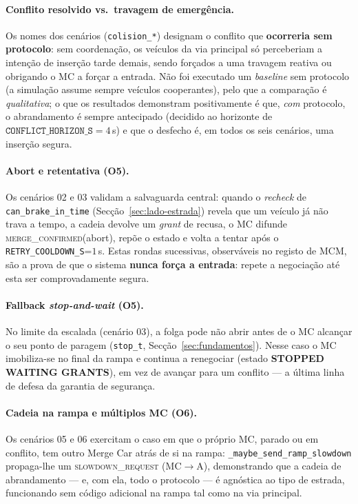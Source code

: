 \documentclass[11pt,a4paper]{article}
\begin{document}
\paragraph{Conflito resolvido vs.\ travagem de emergência.} Os nomes dos cenários
(\texttt{colision\_*}) designam o conflito que \textbf{ocorreria sem protocolo}: sem
coordenação, os veículos da via principal só perceberiam a intenção de inserção tarde
demais, sendo forçados a uma travagem reativa ou obrigando o MC a forçar a entrada. Não
foi executado um \emph{baseline} sem protocolo (a simulação assume sempre veículos
cooperantes), pelo que a comparação é \emph{qualitativa}; o que os resultados demonstram
positivamente é que, \emph{com} protocolo, o abrandamento é sempre antecipado (decidido
ao horizonte de $\texttt{CONFLICT\_HORIZON\_S}=4$\,s) e que o desfecho é, em todos os
seis cenários, uma inserção segura.

\paragraph{Abort e retentativa (O5).} Os cenários 02 e 03 validam a salvaguarda central:
quando o \emph{recheck} de \texttt{can\_brake\_in\_time} (Secção~\ref{sec:lado-estrada})
revela que um veículo já não trava a tempo, a cadeia devolve um \emph{grant} de recusa, o
MC difunde \textsc{merge\_confirmed}(abort), repõe o estado e volta a tentar após o
\texttt{RETRY\_COOLDOWN\_S}=$1$\,s. Estas rondas sucessivas, observáveis no registo de
MCM, são a prova de que o sistema \textbf{nunca força a entrada}: repete a negociação até
esta ser comprovadamente segura.

\paragraph{Fallback \emph{stop-and-wait} (O5).} No limite da escalada (cenário 03), a
folga pode não abrir antes de o MC alcançar o seu ponto de paragem (\texttt{stop\_t},
Secção~\ref{sec:fundamentos}). Nesse caso o MC imobiliza-se no final da rampa e continua a
renegociar (estado \textbf{STOPPED WAITING GRANTS}), em vez de avançar para um conflito ---
a última linha de defesa da garantia de segurança.

\paragraph{Cadeia na rampa e múltiplos MC (O6).} Os cenários 05 e 06 exercitam o caso em
que o próprio MC, parado ou em conflito, tem outro Merge Car atrás de si na rampa:
\texttt{\_maybe\_send\_ramp\_slowdown} propaga-lhe um \textsc{slowdown\_request}
(MC$\rightarrow$A), demonstrando que a cadeia de abrandamento --- e, com ela, todo o
protocolo --- é agnóstica ao tipo de estrada, funcionando sem código adicional na rampa
tal como na via principal.
\end{document}
